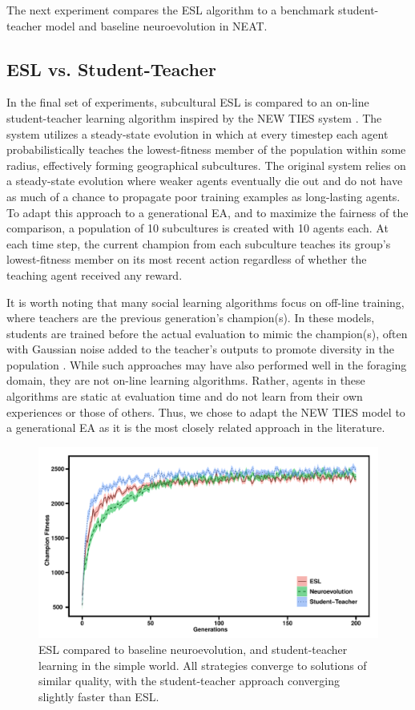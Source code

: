 \documentclass{sig-alternate}
\begin{document}
The next experiment compares the ESL algorithm to a benchmark student-teacher model and baseline neuroevolution in NEAT.

\subsection{ESL vs. Student-Teacher}
In the final set of experiments, subcultural ESL is compared to an on-line student-teacher learning algorithm inspired by the NEW TIES system \cite{haasdijk2008social}. The system utilizes a steady-state evolution in which at every timestep each agent probabilistically teaches the lowest-fitness member of the population within some radius, effectively forming geographical subcultures. The original system relies on a steady-state evolution where weaker agents eventually die out and do not have as much of a chance to propagate poor training examples as long-lasting agents. To adapt this approach to a generational EA, and to maximize the fairness of the comparison, a population of 10 subcultures is created with 10 agents each. At each time step, the current champion from each subculture teaches its group's lowest-fitness member on its most recent action regardless of whether the teaching agent received any reward.

It is worth noting that many social learning algorithms focus on off-line training, where teachers are the previous generation's champion(s). In these models, students are trained before the actual evaluation to mimic the champion(s), often with Gaussian noise added to the teacher's outputs to promote diversity in the population \cite{denaro1996cultural}. While such approaches may have also performed well in the foraging domain, they are not on-line learning algorithms. Rather, agents in these algorithms are static at evaluation time and do not learn from their own experiences or those of others. Thus, we chose to adapt the NEW TIES model to a generational EA as it is the most closely related approach in the literature.

\begin{figure}[t]
  \centering
    \includegraphics[scale=.42]{egalitarian_vs_student_teacher_simple.pdf}
  \caption{ESL compared to baseline neuroevolution, and student-teacher learning in the simple world. All strategies converge to solutions of similar quality, with the student-teacher approach converging slightly faster than ESL.}
  \label{fig:reward-studentteacher-simple}
\end{figure}
\end{document}
